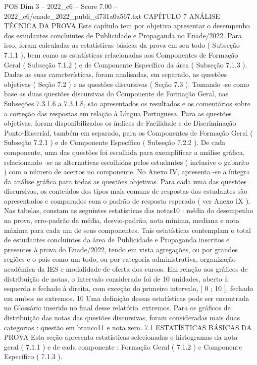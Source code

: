 \begin{textsample}{POS Dim 3 – 2022\_c6 – Score 7.00 – 2022\_c6/enade\_2022\_publi\_d731a0a567.txt}  \label{ex:f3_pos_025}
CAPÍTULO 7 ANÁLISE TÉCNICA DA PROVA Este capítulo tem por objetivo apresentar o desempenho dos estudantes concluintes de Publicidade e Propaganda no Enade/2022.
Para isso, foram calculadas as estatísticas básicas da prova em seu todo ( Subseção 7.1.1 ), bem como as estatísticas relacionadas aos Componentes de Formação Geral ( Subseção 7.1.2 ) e de Componente Específico da área ( Subseção 7.1.3 ).
Dadas as suas características, foram analisadas, em separado, as questões objetivas ( Seção 7.2 ) e as questões discursivas ( Seção 7.3 ).
Tomando -se como base as duas questões discursivas do Componente de Formação Geral, nas Subseções 7.3.1.6 a 7.3.1.8, são apresentados os resultados e os comentários sobre a correção das respostas em relação à Língua Portuguesa.
Para as questões objetivas, foram disponibilizados os índices de Facilidade e de Discriminação Ponto-Bisserial, também em separado, para os Componentes de Formação Geral ( Subseção 7.2.1 ) e de Componente Específico ( Subseção 7.2.2 ).
De cada componente, uma das questões foi escolhida para exemplificar a análise gráfica, relacionando -se as alternativas escolhidas pelos estudantes ( inclusive o gabarito ) com o número de acertos no componente.
No Anexo IV, apresenta -se a íntegra da análise gráfica para todas as questões objetivas.
Para cada uma das questões discursivas, os conteúdos dos tipos mais comuns de respostas dos estudantes são apresentados e comparados com o padrão de resposta esperado ( ver Anexo IX ).
Nas tabelas, constam as seguintes estatísticas das notas10 : média do desempenho na prova, erro-padrão da média, desvio-padrão, nota mínima, mediana e nota máxima para cada um de seus componentes.
Tais estatísticas contemplam o total de estudantes concluintes da área de Publicidade e Propaganda inscritos e presentes à prova do Enade/2022, tendo em vista agregações, ou por grandes regiões e o país como um todo, ou por categoria administrativa, organização acadêmica da IES e modalidade de oferta dos cursos.
Em relação aos gráficos de distribuição de notas, o intervalo considerado foi de 10 unidades, aberto à esquerda e fechado à direita, com exceção do primeiro intervalo, [ 0 ; 10 ], fechado em ambos os extremos. 10 Uma definição dessas estatísticas pode ser encontrada no Glossário inserido no final desse relatório. extremos.
Para os gráficos de distribuição das notas das questões discursivas, foram consideradas mais duas categorias : questão em branco11 e nota zero. 7.1 ESTATÍSTICAS BÁSICAS DA PROVA Esta seção apresenta estatísticas selecionadas e histogramas da nota geral ( 7.1.1 ) e de cada componente : Formação Geral ( 7.1.2 ) e Componente Específico ( 7.1.3 ).

\end{textsample}
